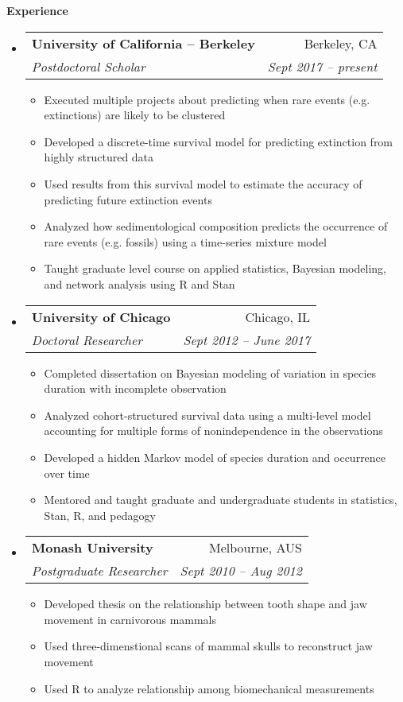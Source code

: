 \documentclass[letterpaper,11pt]{article}
\makeatletter
\newcommand{\resitem}[1]{\item #1 \vspace{-2pt}}
\newcommand{\resheading}[1]{{\large \colorbox{mygrey}{\begin{minipage}{\textwidth}{\textbf{#1 \vphantom{p\^{E}}}}\end{minipage}}}}
\newcommand{\ressubheading}[4]{
  \begin{tabular*}{6.5in}{l@{\extracolsep{\fill}}r}
    \textbf{#1} & #2 \\
    \textit{#3} & \textit{#4} \\
\end{tabular*}\vspace{-6pt}}
\makeatother
\begin{document}
\resheading{Experience}
\begin{itemize}
  \item 
    \ressubheading{University of California -- Berkeley}{Berkeley, CA}{Postdoctoral Scholar}{Sept 2017 -- present}
    { \footnotesize
      \begin{itemize}
          \resitem{Executed multiple projects about predicting when rare events (e.g. extinctions) are likely to be clustered }
          \resitem{Developed a discrete-time survival model for predicting extinction from highly structured data }
          \resitem{Used results from this survival model to estimate the accuracy of predicting future extinction events }
          \resitem{Analyzed how sedimentological composition predicts the occurrence of rare events (e.g. fossils) using a time-series mixture model }
          \resitem{Taught graduate level course on applied statistics, Bayesian modeling, and network analysis using R and Stan }
      \end{itemize}
    }
  \item 
    \ressubheading{University of Chicago}{Chicago, IL}{Doctoral Researcher}{Sept 2012 -- June 2017}
    { \footnotesize
      \begin{itemize}
          \resitem{Completed dissertation on Bayesian modeling of variation in species duration with incomplete observation }
          \resitem{Analyzed cohort-structured survival data using a multi-level model accounting for multiple forms of nonindependence in the observations }
          \resitem{Developed a hidden Markov model of species duration and occurrence over time }
          \resitem{Mentored and taught graduate and undergraduate students in statistics, Stan, R, and pedagogy }
      \end{itemize}
    }
		\item 
			\ressubheading{Monash University}{Melbourne, AUS}{Postgraduate Researcher}{Sept 2010 -- Aug 2012}
				{ \footnotesize
				\begin{itemize}
            \resitem{Developed thesis on the relationship between tooth shape and jaw movement in carnivorous mammals }
            \resitem{Used three-dimenstional scans of mammal skulls to reconstruct jaw movement }
            \resitem{Used R to analyze relationship among biomechanical measurements }

\end{itemize}}
\end{itemize}
\end{document}
